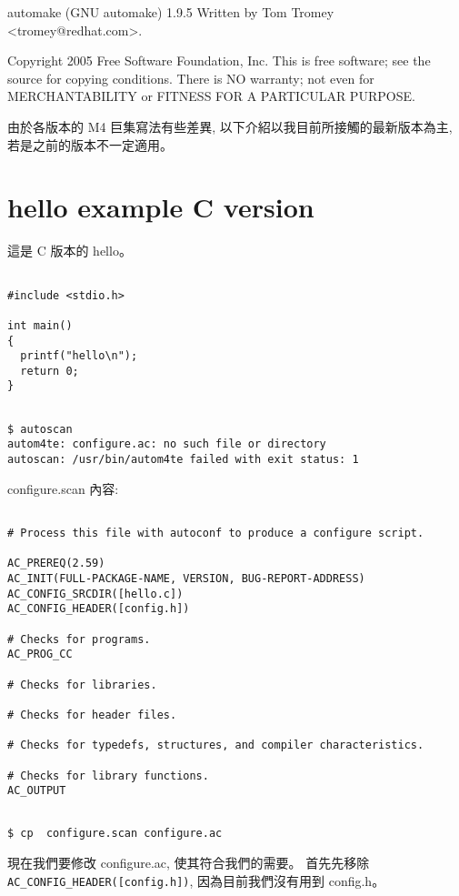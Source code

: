 \documentclass[12pt,a4]{article}
\begin{document}
\begin{CJK}{UTF8}{bsmi}
automake (GNU automake) 1.9.5
Written by Tom Tromey <tromey@redhat.com>.

Copyright 2005 Free Software Foundation, Inc.
This is free software; see the source for copying conditions.  There is NO
warranty; not even for MERCHANTABILITY or FITNESS FOR A PARTICULAR PURPOSE.

由於各版本的 M4 巨集寫法有些差異, 以下介紹以我目前所接觸的最新版本為主,
若是之前的版本不一定適用。

\section{hello example C version}\label{c_hello}

這是 C 版本的 hello。
\begin{verbatim}

#include <stdio.h>

int main()
{
  printf("hello\n");
  return 0;
}
\end{verbatim}

\begin{verbatim}

$ autoscan
autom4te: configure.ac: no such file or directory
autoscan: /usr/bin/autom4te failed with exit status: 1

\end{verbatim}
configure.scan 內容:
\begin{verbatim}

# Process this file with autoconf to produce a configure script.

AC_PREREQ(2.59)
AC_INIT(FULL-PACKAGE-NAME, VERSION, BUG-REPORT-ADDRESS)
AC_CONFIG_SRCDIR([hello.c])
AC_CONFIG_HEADER([config.h])

# Checks for programs.
AC_PROG_CC

# Checks for libraries.

# Checks for header files.

# Checks for typedefs, structures, and compiler characteristics.

# Checks for library functions.
AC_OUTPUT
\end{verbatim}

\begin{verbatim}

$ cp  configure.scan configure.ac
\end{verbatim}

現在我們要修改  configure.ac, 使其符合我們的需要。
首先先移除 \verb+ AC_CONFIG_HEADER([config.h])+,
因為目前我們沒有用到 config.h。


\end{CJK}
\end{document}
